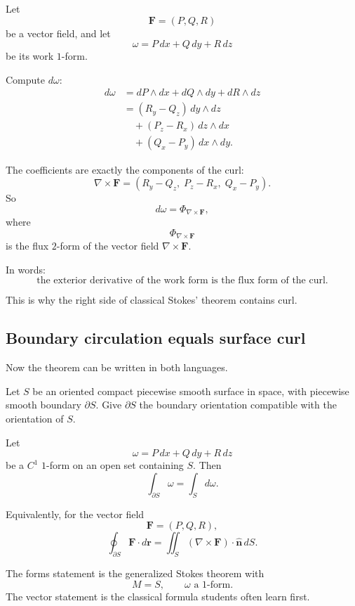 Let
\[
    \mathbf F=(P,Q,R)
\]
be a vector field, and let
\[
    \omega=P\,dx+Q\,dy+R\,dz
\]
be its work \(1\)-form.

Compute \(d\omega\):
\[
\begin{aligned}
d\omega
&=
dP\wedge dx+dQ\wedge dy+dR\wedge dz\\
&=
(R_y-Q_z)\,dy\wedge dz\\
&\quad+
(P_z-R_x)\,dz\wedge dx\\
&\quad+
(Q_x-P_y)\,dx\wedge dy.
\end{aligned}
\]

The coefficients are exactly the components of the curl:
\[
\boxed{
    \nabla\times\mathbf F
    =
    (R_y-Q_z,\;P_z-R_x,\;Q_x-P_y).
}
\]
So
\[
\boxed{
    d\omega=\Phi_{\nabla\times\mathbf F},
}
\]
where
\[
    \Phi_{\nabla\times\mathbf F}
\]
is the flux \(2\)-form of the vector field \(\nabla\times\mathbf F\).

In words:
\[
\boxed{
    \text{the exterior derivative of the work form is the flux form of the curl.}
}
\]

This is why the right side of classical Stokes' theorem contains curl.

\subsection{Boundary circulation equals surface curl}

Now the theorem can be written in both languages.

\begin{theorem}
Let \(S\) be an oriented compact piecewise smooth surface in space, with piecewise
smooth boundary \(\partial S\).  Give \(\partial S\) the boundary orientation compatible
with the orientation of \(S\).

Let
\[
    \omega=P\,dx+Q\,dy+R\,dz
\]
be a \(C^1\) \(1\)-form on an open set containing \(S\).  Then
\[
\boxed{
    \int_{\partial S}\omega=\int_S d\omega.
}
\]

Equivalently, for the vector field
\[
    \mathbf F=(P,Q,R),
\]
\[
\boxed{
    \oint_{\partial S}\mathbf F\cdot d\mathbf r
    =
    \iint_S(\nabla\times\mathbf F)\cdot \widehat{\mathbf n}\,dS.
}
\]
\end{theorem}

The forms statement is the generalized Stokes theorem with
\[
    M=S,
    \qquad
    \omega\text{ a }1\text{-form}.
\]
The vector statement is the classical formula students often learn first.

